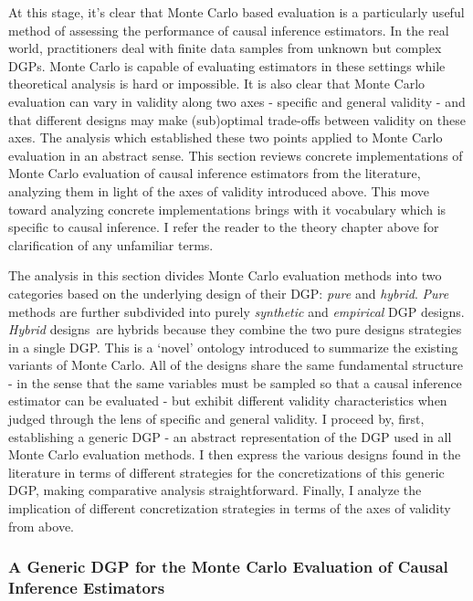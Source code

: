 \documentclass[../main.tex]{subfiles}
\begin{document}
\vspace{\baselineskip}
At this stage, it’s clear that Monte Carlo based evaluation is a particularly useful method of assessing the performance of causal inference estimators. In the real world, practitioners deal with finite data samples from unknown but complex DGPs. Monte Carlo is capable of evaluating estimators in these settings while theoretical analysis is hard or impossible. It is also clear that Monte Carlo evaluation can vary in validity along two axes - specific and general validity - and that different designs may make (sub)optimal trade-offs between validity on these axes. The analysis which established these two points applied to Monte Carlo evaluation in an abstract sense. This section reviews concrete implementations of Monte Carlo evaluation of causal inference estimators from the literature, analyzing them in light of the axes of validity introduced above. This move toward analyzing concrete implementations brings with it vocabulary which is specific to causal inference. I refer the reader to the theory chapter above for clarification of any unfamiliar terms.\par


\vspace{\baselineskip}
The analysis in this section divides Monte Carlo evaluation methods into two categories based on the underlying design of their DGP: \textit{pure} and \textit{hybrid}. \textit{Pure} methods are further subdivided into purely \textit{synthetic }and \textit{empirical }DGP designs. \textit{Hybrid }designs\ are hybrids because they combine the two pure designs strategies in a single DGP. This is a ‘novel’ ontology introduced to summarize the existing variants of Monte Carlo. All of the designs share the same fundamental structure  - in the sense that the same variables must be sampled so that a causal inference estimator can be evaluated - but exhibit different validity characteristics when judged through the lens of specific and general validity. I proceed by, first, establishing a generic DGP - an abstract representation of the DGP used in all Monte Carlo evaluation methods. I then express the various designs found in the literature in terms of different strategies for the concretizations of this generic DGP, making comparative analysis straightforward. Finally, I analyze the implication of different concretization strategies in terms of the axes of validity from above.\par

\subsubsection{A Generic DGP for the Monte Carlo Evaluation of Causal Inference Estimators}
\end{document}
